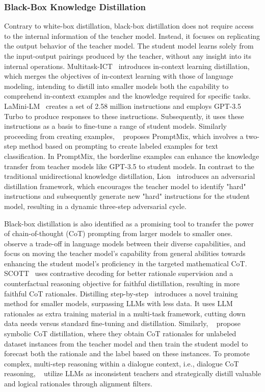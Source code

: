 \subsubsection{Black-Box Knowledge Distillation}
Contrary to white-box distillation, black-box distillation does not require access to the internal information of the teacher model. Instead, it focuses on replicating the output behavior of the teacher model. The student model learns solely from the input-output pairings produced by the teacher, without any insight into its internal operations.
Multitask-ICT~\citep{huang2022context} introduces in-context learning distillation, which merges the objectives of in-context learning with those of language modeling, intending to distill into smaller models both the capability to comprehend in-context examples and the knowledge required for specific tasks.
LaMini-LM~\citep{wu2023lamini} creates a set of 2.58 million instructions and employs GPT-3.5 Turbo to produce responses to these instructions. Subsequently, it uses these instructions as a basis to fine-tune a range of student models.
Similarly proceeding from creating examples, ~\cite{sahu2023promptmix} proposes PromptMix, which involves a two-step method based on prompting to create labeled examples for text classification. In PromptMix, the borderline examples can enhance the knowledge transfer from teacher models like GPT-3.5 to student models.
In contrast to the traditional unidirectional knowledge distillation, Lion~\citep{jiang2023lion} introduces an adversarial distillation framework, which encourages the teacher model to identify "hard" instructions and subsequently generate new "hard" instructions for the student model, resulting in a dynamic three-step adversarial cycle.

Black-box distillation is also identified as a promising tool to transfer the power of chain-of-thought (CoT) prompting from larger models to smaller ones.
~\cite{fu2023specializing} observe a trade-off in language models between their diverse capabilities, and focus on moving the teacher model's capability from general abilities towards enhancing the student model's proficiency in the targeted mathematical CoT.
SCOTT~\citep{wang2023scott} uses contrastive decoding for better rationale supervision and a counterfactual reasoning objective for faithful distillation, resulting in more faithful CoT rationales.
Distilling step-by-step~\citep{hsieh2023distilling} introduces a novel training method for smaller models, surpassing LLMs with less data. It uses LLM rationales as extra training material in a multi-task framework, cutting down data needs versus standard fine-tuning and distillation.
Similarly, ~\cite{li2023symbolic} propose symbolic CoT distillation, where they obtain CoT rationales for unlabeled dataset instances from the teacher model and then train the student model to forecast both the rationale and the label based on these instances.
To promote complex, multi-step reasoning within a dialogue context, i.e., dialogue CoT reasoning, ~\cite{chae2023dialogue} utilize LLMs as inconsistent teachers and strategically distill valuable and logical rationales through alignment filters.



